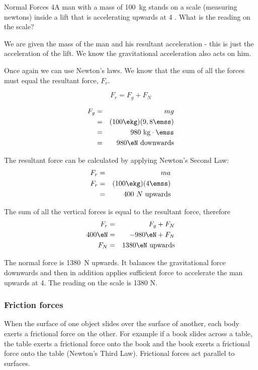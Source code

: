 \begin{wex}{Normal Forces 4}{A man with a mass of 100~kg stands on a scale (measuring newtons) inside a lift that is accelerating upwards at 4 \mss. What is the reading on the scale?}
{
We are given the mass of the man and his resultant acceleration - this is just the acceleration of the lift. We know the gravitational acceleration also acts on him.

Once again we can use Newton's laws. We know that the sum of all the forces must equal the resultant force, $F_r$.

\begin{equation*}
F_r=F_g+F_N
\end{equation*}

\begin{eqnarray*}
F_g&=&mg \\
&=& (100\ekg)(9,8\emss)\\
&=& 980\ \mathrm{kg}\cdot\emss \\
&=& 980\eN\ \mathrm{downwards}
\end{eqnarray*}

The resultant force can be calculated by applying Newton's Second Law:
\begin{eqnarray*}
F_r &=& ma\\
F_r &=& (100\ekg)(4\emss)\\
&=& 400~N~\mbox{upwards}
\end{eqnarray*}

The sum of all the vertical forces is equal to the resultant force, therefore
\begin{eqnarray*}
F_r&=&F_g + F_N \\
400\eN &=& -980\eN + F_N\\
F_N &=& 1380\eN\ \mathrm{upwards}
\end{eqnarray*}

The normal force is 1380~N upwards. It balances the gravitational force downwards and then in addition applies sufficient force to accelerate the man upwards at 4\mss.  The reading on the scale is 1380 N.}
\end{wex}



\subsubsection{Friction forces}
When the surface of one object slides over the surface of another, each body exerts a frictional force on the other. For example if a book slides across a table, the table exerts a frictional force onto the book and the book exerts a frictional force onto the table (Newton's Third Law). Frictional forces act parallel to surfaces.\\

